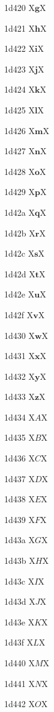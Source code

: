 \documentclass[11pt]{article}
\begin{document}
1d420 X{\ensuremath{\mathbf{g}}}X

1d421 X{\ensuremath{\mathbf{h}}}X

1d422 X{\ensuremath{\mathbf{i}}}X

1d423 X{\ensuremath{\mathbf{j}}}X

1d424 X{\ensuremath{\mathbf{k}}}X

1d425 X{\ensuremath{\mathbf{l}}}X

1d426 X{\ensuremath{\mathbf{m}}}X

1d427 X{\ensuremath{\mathbf{n}}}X

1d428 X{\ensuremath{\mathbf{o}}}X

1d429 X{\ensuremath{\mathbf{p}}}X

1d42a X{\ensuremath{\mathbf{q}}}X

1d42b X{\ensuremath{\mathbf{r}}}X

1d42c X{\ensuremath{\mathbf{s}}}X

1d42d X{\ensuremath{\mathbf{t}}}X

1d42e X{\ensuremath{\mathbf{u}}}X

1d42f X{\ensuremath{\mathbf{v}}}X

1d430 X{\ensuremath{\mathbf{w}}}X

1d431 X{\ensuremath{\mathbf{x}}}X

1d432 X{\ensuremath{\mathbf{y}}}X

1d433 X{\ensuremath{\mathbf{z}}}X

1d434 X{\ensuremath{\mathit{A}}}X

1d435 X{\ensuremath{\mathit{B}}}X

1d436 X{\ensuremath{\mathit{C}}}X

1d437 X{\ensuremath{\mathit{D}}}X

1d438 X{\ensuremath{\mathit{E}}}X

1d439 X{\ensuremath{\mathit{F}}}X

1d43a X{\ensuremath{\mathit{G}}}X

1d43b X{\ensuremath{\mathit{H}}}X

1d43c X{\ensuremath{\mathit{I}}}X

1d43d X{\ensuremath{\mathit{J}}}X

1d43e X{\ensuremath{\mathit{K}}}X

1d43f X{\ensuremath{\mathit{L}}}X

1d440 X{\ensuremath{\mathit{M}}}X

1d441 X{\ensuremath{\mathit{N}}}X

1d442 X{\ensuremath{\mathit{O}}}X
\end{document}
